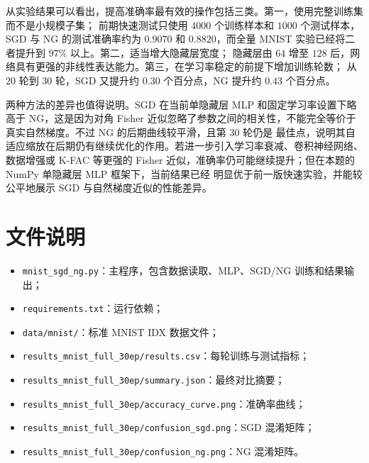 \documentclass[UTF8]{ctexart}
\begin{document}
从实验结果可以看出，提高准确率最有效的操作包括三类。第一，使用完整训练集而不是小规模子集；
前期快速测试只使用 $4000$ 个训练样本和 $1000$ 个测试样本，SGD 与 NG 的测试准确率约为
$0.9070$ 和 $0.8820$，而全量 MNIST 实验已经将二者提升到 $97\%$ 以上。第二，适当增大隐藏层宽度；
隐藏层由 $64$ 增至 $128$ 后，网络具有更强的非线性表达能力。第三，在学习率稳定的前提下增加训练轮数；
从 $20$ 轮到 $30$ 轮，SGD 又提升约 $0.30$ 个百分点，NG 提升约 $0.43$ 个百分点。

两种方法的差异也值得说明。SGD 在当前单隐藏层 MLP 和固定学习率设置下略高于 NG，这是因为对角 Fisher
近似忽略了参数之间的相关性，不能完全等价于真实自然梯度。不过 NG 的后期曲线较平滑，且第 $30$ 轮仍是
最佳点，说明其自适应缩放在后期仍有继续优化的作用。若进一步引入学习率衰减、卷积神经网络、数据增强或
K-FAC 等更强的 Fisher 近似，准确率仍可能继续提升；但在本题的 NumPy 单隐藏层 MLP 框架下，当前结果已经
明显优于前一版快速实验，并能较公平地展示 SGD 与自然梯度近似的性能差异。

\section{文件说明}

\begin{itemize}
  \item \texttt{mnist\_sgd\_ng.py}：主程序，包含数据读取、MLP、SGD/NG 训练和结果输出；
  \item \texttt{requirements.txt}：运行依赖；
  \item \texttt{data/mnist/}：标准 MNIST IDX 数据文件；
  \item \texttt{results\_mnist\_full\_30ep/results.csv}：每轮训练与测试指标；
  \item \texttt{results\_mnist\_full\_30ep/summary.json}：最终对比摘要；
  \item \texttt{results\_mnist\_full\_30ep/accuracy\_curve.png}：准确率曲线；
  \item \texttt{results\_mnist\_full\_30ep/confusion\_sgd.png}：SGD 混淆矩阵；
  \item \texttt{results\_mnist\_full\_30ep/confusion\_ng.png}：NG 混淆矩阵。
\end{itemize}
\end{document}
